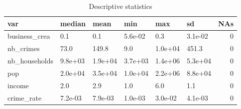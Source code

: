 \begin{table}[ht]
\centering
\begin{tabular}{llllllr}
  \hline
var & median & mean & min & max & sd & NAs \\ 
  \hline
business\_crea & 0.1 & 0.1 & 5.6e-02 & 0.3 & 3.1e-02 &   0 \\ 
  nb\_crimes & 73.0 & 149.8 & 9.0 & 1.0e+04 & 451.3 &   0 \\ 
  nb\_households & 9.8e+03 & 1.9e+04 & 3.7e+03 & 1.4e+06 & 5.3e+04 &   0 \\ 
  pop & 2.0e+04 & 3.5e+04 & 1.0e+04 & 2.2e+06 & 8.8e+04 &   0 \\ 
  income & 2.0 & 2.9 & 1.0 & 6.0 & 1.1 &   0 \\ 
  crime\_rate & 7.2e-03 & 7.9e-03 & 1.0e-03 & 3.0e-02 & 4.1e-03 &   0 \\ 
   \hline
\end{tabular}
\caption{Descriptive statistics} 
\label{desc2}
\end{table}

